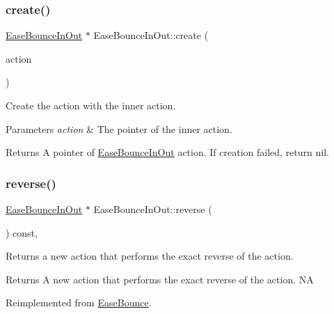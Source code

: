 \subsubsection{\texorpdfstring{create()}{create()}}
{\footnotesize\ttfamily \hyperlink{classEaseBounceInOut}{Ease\+Bounce\+In\+Out} $\ast$ Ease\+Bounce\+In\+Out\+::create (\begin{DoxyParamCaption}\item[{\hyperlink{classActionInterval}{Action\+Interval} $\ast$}]{action }\end{DoxyParamCaption})\hspace{0.3cm}{\ttfamily [static]}}



Create the action with the inner action. 


\begin{DoxyParams}{Parameters}
{\em action} & The pointer of the inner action. \\
\hline
\end{DoxyParams}
\begin{DoxyReturn}{Returns}
A pointer of \hyperlink{classEaseBounceInOut}{Ease\+Bounce\+In\+Out} action. If creation failed, return nil. 
\end{DoxyReturn}
\mbox{\label{classEaseBounceInOut_a5fce37e1a14d4f5ed99d19fad6b354f9}} 
\subsubsection{\texorpdfstring{reverse()}{reverse()}}
{\footnotesize\ttfamily \hyperlink{classEaseBounceInOut}{Ease\+Bounce\+In\+Out} $\ast$ Ease\+Bounce\+In\+Out\+::reverse (\begin{DoxyParamCaption}\item[{void}]{ }\end{DoxyParamCaption}) const\hspace{0.3cm}{\ttfamily [override]}, {\ttfamily [virtual]}}

Returns a new action that performs the exact reverse of the action.

\begin{DoxyReturn}{Returns}
A new action that performs the exact reverse of the action.  NA 
\end{DoxyReturn}


Reimplemented from \hyperlink{classEaseBounce_abbd0a4bae312fa781f226cad16222773}{Ease\+Bounce}.

